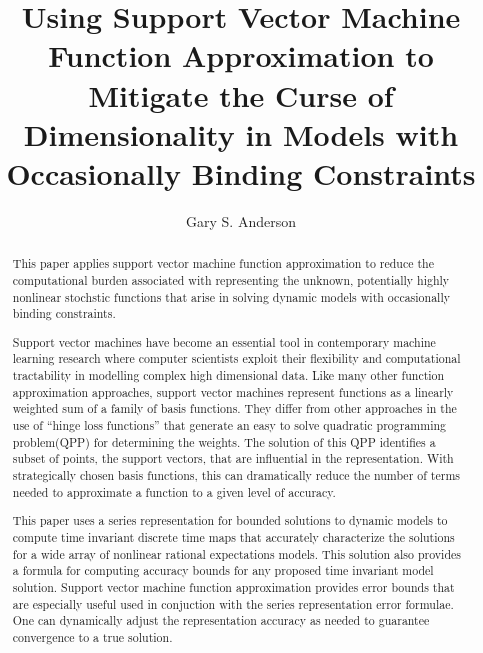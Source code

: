 \documentclass[12pt]{article}
\title{Using Support Vector Machine Function Approximation to
Mitigate the Curse of Dimensionality in Models with Occasionally Binding Constraints}
\author{Gary S. Anderson}
\begin{document}
\begin{abstract}


This paper applies support vector machine function approximation to
reduce the computational burden associated with representing the
unknown, potentially highly nonlinear stochstic functions that arise in
solving dynamic models with occasionally binding constraints.


Support vector machines 
have become an essential tool in contemporary machine learning research
where computer scientists exploit their flexibility and
computational tractability in modelling complex high dimensional data.
Like many other function approximation approaches,
support vector machines represent functions as a linearly weighted sum
of a family of basis functions.  They differ from other approaches in  the
use of ``hinge loss functions'' that generate
an easy to solve
quadratic programming problem(QPP) for determining the weights.
The solution of this QPP identifies a subset of points, the support vectors,
that are influential in the representation.  With strategically chosen
basis functions, this can dramatically reduce the number of terms needed
to approximate a function to a given level of accuracy.


This paper uses a series representation for bounded solutions
to dynamic models to compute
  time invariant discrete time
maps that accurately characterize
the solutions for a wide array of nonlinear
rational expectations models. This solution also provides a formula for computing accuracy bounds for any proposed time invariant model solution.
Support vector machine function approximation provides
error bounds that 
are especially useful used in conjuction with the series representation
error formulae.
One can  dynamically adjust the representation accuracy
as needed to guarantee convergence to a true solution.

\end{abstract}
\end{document}
